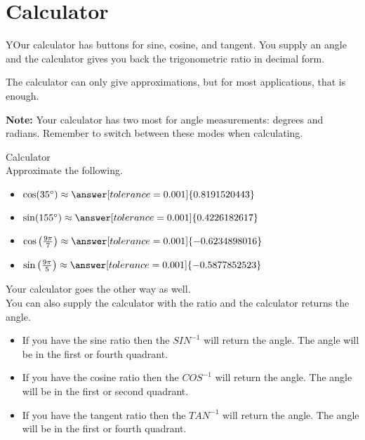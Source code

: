 \documentclass{ximera}
\begin{document}
\section{Calculator}

YOur calculator has buttons for sine, cosine, and tangent. You supply an angle and the calculator gives you back the trigonometric ratio in decimal form.

The calculator can only give approximations, but for most applications, that is enough.


\textbf{Note:}  Your calculator has two most for angle measurements: degrees and radians.  Remember to switch between these modes when calculating.



\begin{question} Calculator \\

Approximate the following.

\begin{itemize}
\item $\cos(35^{\circ}) \approx \answer[tolerance=0.001]{0.8191520443}$
\item $\sin(155^{\circ}) \approx \answer[tolerance=0.001]{0.4226182617}$
\item $\cos\left( \frac{9\pi}{7} \right) \approx \answer[tolerance=0.001]{-0.6234898016}$
\item $\sin\left( \frac{9\pi}{5} \right) \approx \answer[tolerance=0.001]{-0.5877852523}$
\end{itemize}

\end{question}





Your calculator goes the other way as well. \\




You can also supply the calculator with the ratio and the calculator returns the angle.

\begin{itemize}
\item If you have the sine ratio then the $SIN^{-1}$ will return the angle. The angle will be in the first or fourth quadrant.
\item If you have the cosine ratio then the $COS^{-1}$ will return the angle. The angle will be in the first or second quadrant.
\item If you have the tangent ratio then the $TAN^{-1}$ will return the angle. The angle will be in the first or fourth quadrant.
\end{itemize}
\end{document}
